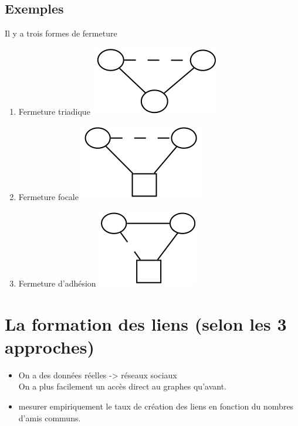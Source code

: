 \subsection{Exemples}
Il y a trois formes de fermeture
\begin{enumerate}
\item Fermeture triadique \includegraphics[scale=0.1]{images/21_FermetureTriadique.png}
\item Fermeture focale \includegraphics[scale=0.1]{images/21_FermetureFocale.png}
\item Fermeture d'adhésion \includegraphics[scale=0.1]{images/21_FermetureAdhesion.png}
\end{enumerate}

\section{La formation des liens (selon les 3 approches)}
\begin{itemize}
\item On a des données réelles -> réseaux sociaux \\
		On a plus facilement un accès direct au graphes qu'avant.
\item mesurer empiriquement le taux de création des liens en fonction du nombres d'amis communs.
\end{itemize}

